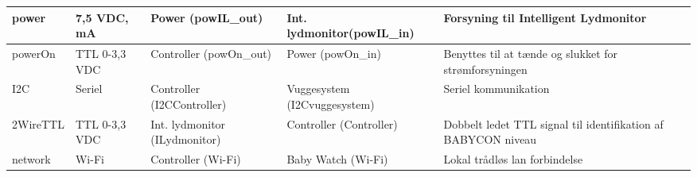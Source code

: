 \begin{center}
\begin{longtable}{|p{}|p{}|p{}|p{}|p{3cm}|}
power
&7,5 VDC, \newline 1500 mA
&Power \newline(powIL\_out)
&Int. lydmonitor\newline(powIL\_in)
&Forsyning til Intelligent Lydmonitor
\\\hline

powerOn			
&TTL 0-3,3 VDC				
&Controller \newline (powOn\_out) 			
&Power \newline (powOn\_in)	
&Benyttes til at tænde og slukket for strømforsyningen   		\\\hline

I2C			
&Seriel				
&Controller \newline (I2CController) 			
&Vuggesystem \newline (I2Cvuggesystem) 	
&Seriel kommunikation
\\\hline

2WireTTL			
&TTL 0-3,3 VDC					
&Int. lydmonitor \newline (ILydmonitor) 			
&Controller \newline (Controller) 	
&Dobbelt ledet TTL signal til identifikation af BABYCON niveau
\\\hline

network			
&Wi-Fi				
&Controller \newline (Wi-Fi) 			
&Baby Watch \newline (Wi-Fi)	
&Lokal trådløs lan forbindelse   				\\\hline

\end{longtable}
\end{center}